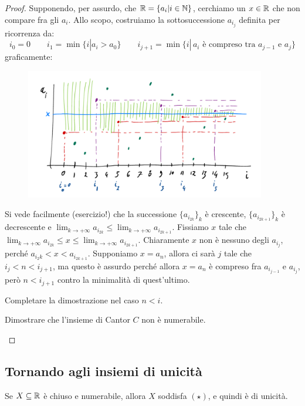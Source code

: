 \begin{proof}
Supponendo, per assurdo, che $\mathbb R = \{a_i | i \in \mathbb N\}$, cerchiamo un $x \in \mathbb R$ che non compare fra gli $a_i$. Allo scopo, costruiamo la sottosuccessione $a_{i_j}$
definita per ricorrenza da:
\[ i_0 = 0 \qquad i_1 = \min\{i | a_i > a_0\} \qquad i_{j+1} = \min\{i | \, \text{$a_i$ è compreso tra $a_{j-1}$ e $a_j$}\}
	\]
graficamente:

	\begin{figure}[H]
		\centering
		\includegraphics[width=10.5cm]{immagini/RRnum.png}
	\end{figure}

Si vede facilmente (esercizio!) che la successione $\{a_{i_{2k}}\}_k$ è crescente, $\{a_{i_{2k+1}}\}_k$ è decrescente 
e $ \lim_{k \to +\infty} a_{i_{2k}} \leq \lim_{k \to +\infty}a_{i_{2k+1}}$. Fissiamo $x$ tale che $ \lim_{k \to +\infty} a_{i_{2k}} \leq x \leq \lim_{k \to +\infty} a_{i_{2k+1}}$.
Chiaramente $x$ non è nessuno degli $a_{i_j}$, perché $a_{i_2k} < x < a_{i_{2k+1}}$. Supponiamo $x = a_n$, allora ci sarà $j$ tale che $i_j < n < i_{j+1}$, ma 
questo è assurdo perché allora $x = a_n$ è compreso fra $a_{i_{j-1}}$ e $a_{i_j}$, però $n < i_{j+1}$ contro la minimalità di quest'ultimo.

\begin{exercise}
Completare la dimostrazione nel caso $n < i$.
\end{exercise}

\begin{exercise}
Dimostrare che l'insieme di Cantor $C$ non è numerabile.
\end{exercise}
\end{proof}

\pagebreak
\subsection{Tornando agli insiemi di unicità}

\begin{theorem}
\label{CL}
Se $X \subseteq \mathbb R$ è chiuso e numerabile, allora $X$ soddisfa $(\star)$, e quindi è di unicità.
\end{theorem}

